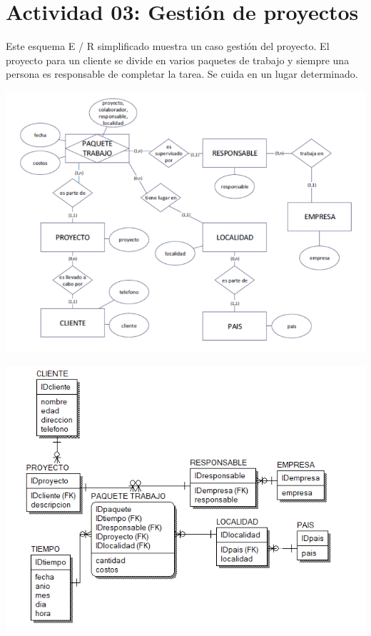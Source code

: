 \section{Actividad 03: Gestión de proyectos} 

Este esquema E / R simplificado muestra un caso gestión del proyecto.
El proyecto para un cliente se divide en varios paquetes de trabajo y siempre una persona es responsable de completar la
tarea. Se cuida en un lugar determinado.\\

	\begin{center}
	\includegraphics[width=15cm]{./Imagenes/img3}
	\end{center}	

	\begin{center}
	\includegraphics[width=15cm]{./Imagenes/img3-3}
	\end{center}	
